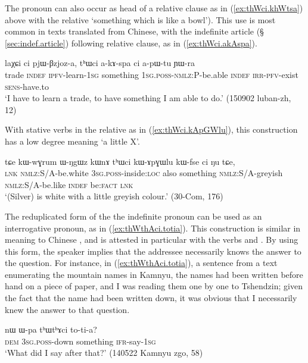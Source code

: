 The pronoun   can also occur as head of a relative clause as in (\ref{ex:thWci.khWtsa}) above with the relative  `something which is like a bowl'). This use is most common in texts translated from Chinese, with the indefinite article  (§ \ref{sec:indef.article}) following relative clause, as in (\ref{ex:thWci.akAspa}). 

\begin{exe}
\ex \label{ex:thWci.akAspa}
\gll  laχɕi ci pjɯ-βzjoz-a, tʰɯci a-kɤ-spa ci a-pɯ-tu ɲɯ-ra  \\
 trade \textsc{indef} \textsc{ipfv}-learn-\textsc{1sg} something \textsc{1sg.poss-nmlz:P}-be.able \textsc{indef} \textsc{irr-pfv}-exist \textsc{sens}-have.to \\
 \glt `I have to learn a trade, to have something I am able to do.' (150902 luban-zh, 12)
\end{exe}
 
With stative verbs in the relative as in (\ref{ex:thWci.kApGWlu}), this construction has a low degree meaning `a little X'.

\begin{exe}
\ex \label{ex:thWci.kApGWlu}
\gll   tɕe kɯ-wɣrum ɯ-ŋgɯz kɯnɤ tʰɯci kɯ-ɤpɣɯlu kɯ-fse ci ŋu tɕe, \\
\textsc{lnk} \textsc{nmlz}:S/A-be.white \textsc{3sg}.\textsc{poss}-inside:\textsc{loc} also something \textsc{nmlz}:S/A-greyish \textsc{nmlz}:S/A-be.like \textsc{indef} be:\textsc{fact} \textsc{lnk} \\
\glt `(Silver) is white with a little greyish colour.' (30-Com, 176)
\end{exe}
  
 The reduplicated form of the the indefinite pronoun  can be used as an interrogative pronoun, as in (\ref{ex:thWthAci.totia}). This construction is similar in meaning to Chinese , and is attested in particular with the verbs  and . By using this form, the speaker implies that the addressee necessarily knows the answer to the question. For instance,  in (\ref{ex:thWthAci.totia}), a sentence from a text enumerating the mountain names in Kamnyu, the names had been written before hand on a piece of paper, and I was reading them one by one to Tshendzin; given the fact that the name had been written down, it was obvious that I necessarily knew the answer to that question.
  
 \begin{exe}
\ex \label{ex:thWthAci.totia}
 \gll  nɯ ɯ-pa tʰɯtʰɤci to-ti-a? \\
 \textsc{dem} \textsc{3sg}.\textsc{poss}-down something \textsc{ifr}-say-\textsc{1sg} \\
 \glt `What did I say after that?' (140522 Kamnyu zgo, 58)
\end{exe}

